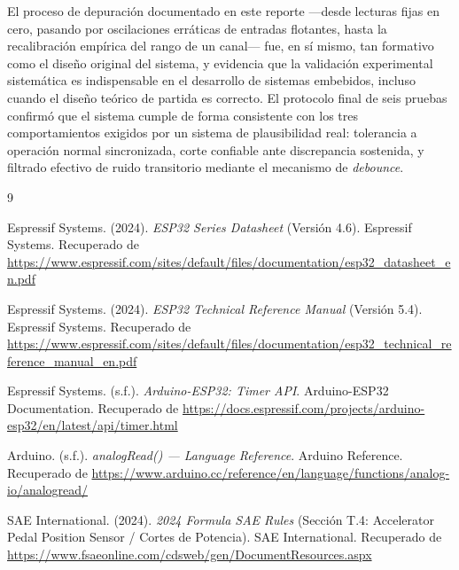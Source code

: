 \documentclass[12pt, letterpaper]{article}
\begin{document}
	El proceso de depuración documentado en este reporte —desde lecturas fijas en cero, pasando por oscilaciones erráticas de entradas flotantes, hasta la recalibración empírica del rango de un canal— fue, en sí mismo, tan formativo como el diseño original del sistema, y evidencia que la validación experimental sistemática es indispensable en el desarrollo de sistemas embebidos, incluso cuando el diseño teórico de partida es correcto. El protocolo final de seis pruebas confirmó que el sistema cumple de forma consistente con los tres comportamientos exigidos por un sistema de plausibilidad real: tolerancia a operación normal sincronizada, corte confiable ante discrepancia sostenida, y filtrado efectivo de ruido transitorio mediante el mecanismo de \textit{debounce}.
	
	\newpage
	\renewcommand{\refname}{Bibliografía}
	\begin{thebibliography}{9}
		
		Espressif Systems. (2024). \textit{ESP32 Series Datasheet} (Versión 4.6). Espressif Systems. Recuperado de \url{https://www.espressif.com/sites/default/files/documentation/esp32_datasheet_en.pdf}
		
		Espressif Systems. (2024). \textit{ESP32 Technical Reference Manual} (Versión 5.4). Espressif Systems. Recuperado de \url{https://www.espressif.com/sites/default/files/documentation/esp32_technical_reference_manual_en.pdf}
		
		Espressif Systems. (s.f.). \textit{Arduino-ESP32: Timer API}. Arduino-ESP32 Documentation. Recuperado de \url{https://docs.espressif.com/projects/arduino-esp32/en/latest/api/timer.html}
		
		Arduino. (s.f.). \textit{analogRead() — Language Reference}. Arduino Reference. Recuperado de \url{https://www.arduino.cc/reference/en/language/functions/analog-io/analogread/}
		
		SAE International. (2024). \textit{2024 Formula SAE Rules} (Sección T.4: Accelerator Pedal Position Sensor / Cortes de Potencia). SAE International. Recuperado de \url{https://www.fsaeonline.com/cdsweb/gen/DocumentResources.aspx}
		
	\end{thebibliography}
	
\end{document}
